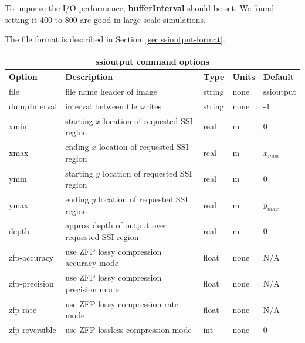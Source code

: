 \documentclass[11pt]{report}
\begin{document}
{To imporve the I/O performance, {\bf bufferInterval} should be set. We found setting it 400 to 800 are good in large scale simulations.



The file format is described in Section~\ref{sec:ssioutput-format}.
%
\begin{center}
	\begin{tabular}{|l|p{8cm}|l|l|l|} \hline
		\multicolumn{5}{|c|}{\bf ssioutput command options}                                                          \\ \hline
		{\bf Option}   & {\bf Description}                                & {\bf Type} & {\bf Units} & {\bf Default} \\ \hline
		\hline
		file           & file name header of image                        & string     & none
		               & ssioutput                                                                                   \\ \hline
		dumpInterval   & interval between file writes                     & string     & none        & -1            \\ \hline
		xmin           & starting $x$ location of requested SSI region    & real       & m           & 0             \\ \hline
		xmax           & ending $x$ location of requested SSI region      & real       & m           & $x_{max}$     \\ \hline
		ymin           & starting $y$ location of requested SSI region    & real       & m           & 0             \\ \hline
		ymax           & ending $y$ location of requested SSI region      & real       & m           & $y_{max}$     \\ \hline
		depth          & approx depth of output over requested SSI region & real       & m           & 0             \\ \hline
		zfp-accuracy   & use ZFP lossy compression accuracy mode          & float      & none        & N/A           \\ \hline
		zfp-precision  & use ZFP lossy compression precision mode         & float      & none        & N/A           \\ \hline
		zfp-rate       & use ZFP lossy compression rate mode              & float      & none        & N/A           \\ \hline
		zfp-reversible & use ZFP lossless compression mode                & int        & none        & 0             \\ \hline
	\end{tabular}
\end{center}

}
\end{document}
